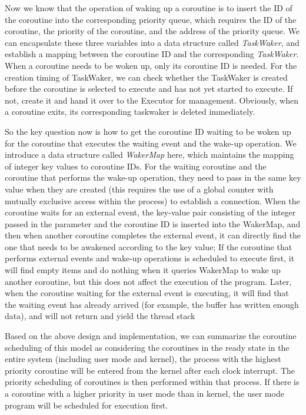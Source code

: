 \documentclass[10pt]{article}
\begin{document}
Now we know that the operation of waking up a coroutine is to insert the ID of the coroutine into the corresponding priority queue, which requires the ID of the coroutine, the priority of the coroutine, and the address of the priority queue. We can encapsulate these three variables into a data structure called \textit{TaskWaker}, and establish a mapping between the coroutine ID and the corresponding \textit{TaskWaker}. When a coroutine needs to be woken up, only its coroutine ID is needed. For the creation timing of TaskWaker, we can check whether the TaskWaker is created before the coroutine is selected to execute and has not yet started to execute. If not, create it and hand it over to the Executor for management. Obviously, when a coroutine exits, its corresponding taskwaker is deleted immediately.

So the key question now is how to get the coroutine ID waiting to be woken up for the coroutine that executes the waiting event and the wake-up operation. We introduce a data structure called \textit{WakerMap} here, which maintains the mapping of integer key values to coroutine IDs. For the waiting coroutine and the coroutine that performs the wake-up operation, they need to pass in the same key value when they are created (this requires the use of a global counter with mutually exclusive access within the process) to establish a connection. When the coroutine waits for an external event, the key-value pair consisting of the integer passed in the parameter and the coroutine ID is inserted into the WakerMap, and then when another coroutine completes the external event, it can directly find the one that needs to be awakened according to the key value; If the coroutine that performs external events and wake-up operations is scheduled to execute first, it will find empty items and do nothing when it queries WakerMap to wake up another coroutine, but this does not affect the execution of the program. Later, when the coroutine waiting for the external event is executing, it will find that the waiting event has already arrived (for example, the buffer has written enough data), and will not return and yield the thread stack

Based on the above design and implementation, we can summarize the coroutine scheduling of this model as considering the coroutines in the ready state in the entire system (including user mode and kernel), the process with the highest priority coroutine will be entered from the kernel after each clock interrupt. The priority scheduling of coroutines is then performed within that process. If there is a coroutine with a higher priority in user mode than in kernel, the user mode program will be scheduled for execution first.
\end{document}
